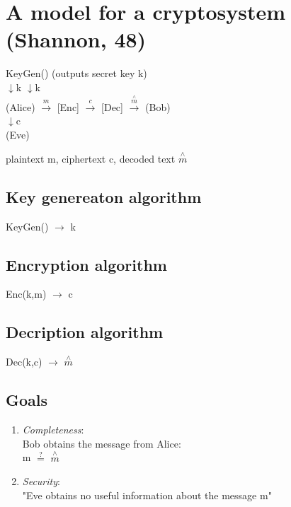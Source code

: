 \documentclass{report}
\begin{document}
 \newpage
 
 \section{A model for a cryptosystem (Shannon, 48)}
 \begin{center}
 	KeyGen() (outputs secret key k) \\
 	$\downarrow$k \hspace{3.8cm} $\downarrow$k\\
 	(Alice)	$\stackrel{m}{\rightarrow }$ [Enc] $\stackrel{c}{\longrightarrow }$ [Dec] $\stackrel{\stackrel{\wedge}{m}}{\rightarrow }$ (Bob) \\
 	$\downarrow$c \\
 	(Eve) \\
 \end{center}
 	plaintext m, ciphertext c, decoded text $\stackrel{\wedge}{m}$ \\
 \subsection{Key genereaton algorithm}
 KeyGen() $\rightarrow$ k
 \subsection{Encryption algorithm}
 Enc(k,m) $\rightarrow$ c
 \subsection{Decription algorithm}
 Dec(k,c) $\rightarrow$ $\stackrel{\wedge}{m}$
 \subsection{Goals}
 \begin{enumerate}
 	\item \textit{Completeness}: \\
 		Bob obtains the message from Alice: \\
 		m $\stackrel{?}{=}$ $\stackrel{\wedge}{m}$
 		\item \textit{Security}: \\
 		"Eve obtains no useful information about the message m"
 \end{enumerate}
 
\end{document}
